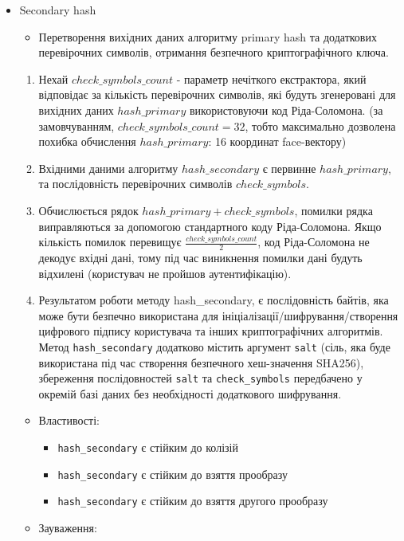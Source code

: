 \documentclass[11pt]{article}
\providecommand{\tightlist}{%
      \setlength{\itemsep}{0pt}\setlength{\parskip}{0pt}}
\begin{document}
    \begin{itemize}
\tightlist
\item
  Secondary hash

  \begin{itemize}
  \tightlist
  \item
    Перетворення вихідних даних алгоритму primary hash та додаткових
    перевірочних символів, отримання безпечного криптографічного ключа.
  \end{itemize}

  \begin{enumerate}
  \def\labelenumi{\arabic{enumi}.}
  \tightlist
  \item
    Нехай \(check\_symbols\_count\) - параметр нечіткого
    екстрактора, який відповідає за кількість перевірочних символів, які
    будуть згенеровані для вихідних даних \(hash\_primary\)
    використовуючи код Ріда-Соломона. (за замовчуванням,
    \(check\_symbols\_count = 32\), тобто максимально дозволена
    похибка обчислення \(hash\_primary\): 16 координат
    face-вектору)
  \item
    Вхідними даними алгоритму \(hash\_secondary\) є первинне
    \(hash\_primary\), та послідовність перевірочних символів
    \(check\_symbols\).
  \item
    Обчислюється рядок \(hash\_primary+check\_symbols\),
    помилки рядка виправляються за допомогою стандартного коду
    Ріда-Соломона. Якщо кількість помилок перевищує
    \(\frac{check\_symbols\_count}{2}\), код Ріда-Соломона не
    декодує вхідні дані, тому під час виникнення помилки дані будуть
    відхилені (користувач не пройшов аутентифікацію).
  \item
    Результатом роботи методу hash\_secondary, є послідовність байтів,
    яка може бути безпечно використана для
    ініціалізації/шифрування/створення цифрового підпису користувача та
    інших криптографічних алгоритмів. Метод \texttt{hash\_secondary}
    додатково містить аргумент \texttt{salt} (сіль, яка буде використана
    під час створення безпечного хеш-значення SHA256), збереження
    послідовностей \texttt{salt} та \texttt{check\_symbols} передбачено
    у окремій базі даних без необхідності додаткового шифрування.
  \end{enumerate}

  \begin{itemize}
  \tightlist
  \item
    Властивості:

    \begin{itemize}
    \tightlist
    \item
      \texttt{hash\_secondary} є стійким до колізій
    \item
      \texttt{hash\_secondary} є стійким до взяття прообразу
    \item
      \texttt{hash\_secondary} є стійким до взяття другого прообразу
    \end{itemize}
  \item
    Зауваження:


\end{itemize}
\end{itemize}
\end{document}
